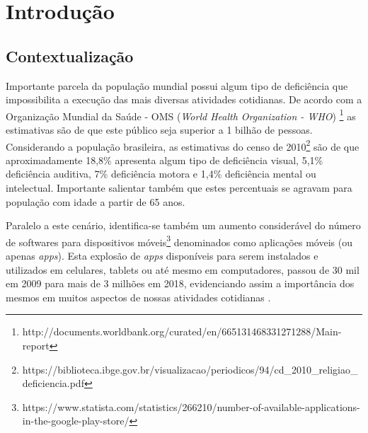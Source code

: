 \documentclass[
	12pt,				%
	oneside,			%
	a4paper,			%
	english,			%
	brazil				%
	]{abntex2ppgsi}
\begin{document}
\tableofcontents*
\cleardoublepage



\textual



% 
%
%
\chapter{Introdução}


\section{Contextualização}

Importante parcela da população mundial possui algum tipo de deficiência que impossibilita a execução das mais diversas atividades cotidianas. De acordo com a Organização Mundial da Saúde - OMS (\textit{World Health Organization - WHO}) \footnote{http://documents.worldbank.org/curated/en/665131468331271288/Main-report} as estimativas são de que este público seja superior a 1 bilhão de pessoas. Considerando a população brasileira, as estimativas do censo de 2010\footnote{https://biblioteca.ibge.gov.br/visualizacao/periodicos/94/cd\_2010\_religiao\_deficiencia.pdf} são de que aproximadamente 18,8\% apresenta algum tipo de deficiência visual, 5,1\% deficiência auditiva, 7\% deficiência motora e 1,4\% deficiência mental ou intelectual. Importante salientar também que estes percentuais se agravam para população com idade a partir de 65 anos.

Paralelo a este cenário, identifica-se também um aumento considerável do número de softwares para dispositivos móveis\footnote{https://www.statista.com/statistics/266210/number-of-available-applications-in-the-google-play-store/} denominados como aplicações móveis (ou apenas \textit{apps}). Esta explosão de \textit{apps} disponíveis para serem instalados e utilizados em celulares, tablets ou até mesmo em computadores, passou de 30 mil em 2009 para mais de 3 milhões em 2018, evidenciando assim a importância dos mesmos em muitos aspectos de nossas atividades cotidianas \cite{storeanalysis}.
\end{document}
